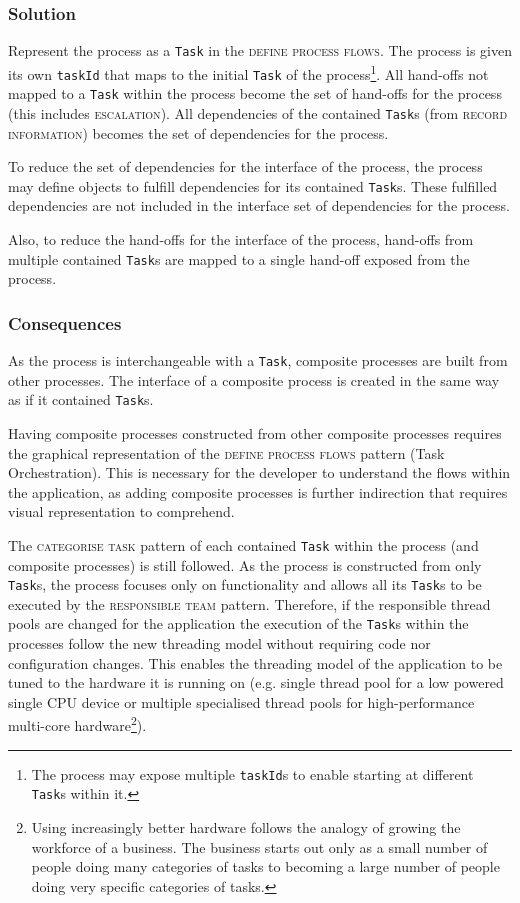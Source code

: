 \documentclass[prodmode]{style/acmlarge}
\begin{document}
\subsubsection*{Solution} Represent the process as a \texttt{Task} in the
\textsc{define process flows}.  The process is given its own \texttt{taskId}
that maps to the initial \texttt{Task} of the process\footnote{The process may
expose multiple \texttt{taskId}s to enable starting at different \texttt{Task}s
within it.}.  All hand-offs not mapped to a \texttt{Task} within the process
become the set of hand-offs for the process (this includes \textsc{escalation}).
All dependencies of the contained \texttt{Task}s (from \textsc{record
information}) becomes the set of dependencies for the process.

To reduce the set of dependencies for the interface of the process, the process
may define objects to fulfill dependencies for its contained \texttt{Task}s.  These
fulfilled dependencies are not included in the interface set of dependencies for
the process.

Also, to reduce the hand-offs for the interface of the process, hand-offs
from multiple contained \texttt{Task}s are mapped to a single hand-off exposed
from the process.

\subsubsection*{Consequences} As the process is interchangeable with a
\texttt{Task}, composite processes are built from other processes.  The
interface of a composite process is created in the same way as if it contained
\texttt{Task}s.

Having composite processes constructed from other composite processes requires
the graphical representation of the \textsc{define process flows} pattern (Task
Orchestration).  This is necessary for the developer to understand the flows
within the application, as adding composite processes is further indirection
that requires visual representation to comprehend.

The \textsc{categorise task} pattern of each contained \texttt{Task} within the
process (and composite processes) is still followed.  As the process is
constructed from only \texttt{Task}s, the process focuses only on functionality
and allows all its \texttt{Task}s to be executed by the \textsc{responsible
team} pattern.  Therefore, if the responsible thread pools are changed for the
application the execution of the \texttt{Task}s within the processes follow the new
threading model without requiring code nor configuration changes.  This enables
the threading model of the application to be tuned to the hardware it is running
on (e.g. single thread pool for a low powered single CPU device or multiple
specialised thread pools for high-performance multi-core hardware\footnote{Using
increasingly better hardware follows the analogy of growing the workforce of a
business.  The business starts out only as a small number of people doing many
categories of tasks to becoming a large number of people doing very specific
categories of tasks.}).
\end{document}
